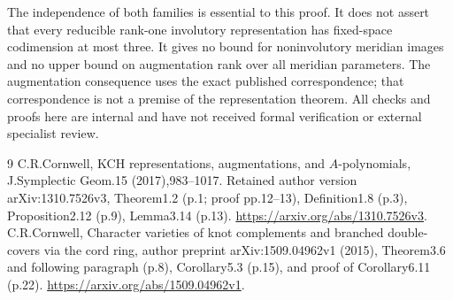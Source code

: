 \documentclass[11pt]{article}
\begin{document}
The independence of both families is essential to this proof.
It does not assert that every reducible rank-one involutory
representation has fixed-space codimension at most three.
It gives no bound for noninvolutory meridian images and no upper
bound on augmentation rank over all meridian parameters.
The augmentation consequence uses the exact published correspondence;
that correspondence is not a premise of the representation theorem.
All checks and proofs here are internal and have not received
formal verification or external specialist review.
\begin{thebibliography}{9}
 C.R.Cornwell, KCH representations, augmentations,
and $A$-polynomials, J.Symplectic Geom.15 (2017),983--1017.
Retained author version arXiv:1310.7526v3, Theorem1.2 (p.1;
proof pp.12--13), Definition1.8 (p.3), Proposition2.12 (p.9),
Lemma3.14 (p.13).
\url{https://arxiv.org/abs/1310.7526v3}.
 C.R.Cornwell, Character varieties of knot complements
and branched double-covers via the cord ring, author preprint
arXiv:1509.04962v1 (2015), Theorem3.6 and following paragraph (p.8),
Corollary5.3 (p.15), and proof of Corollary6.11 (p.22).
\url{https://arxiv.org/abs/1509.04962v1}.
\end{thebibliography}
\end{document}
